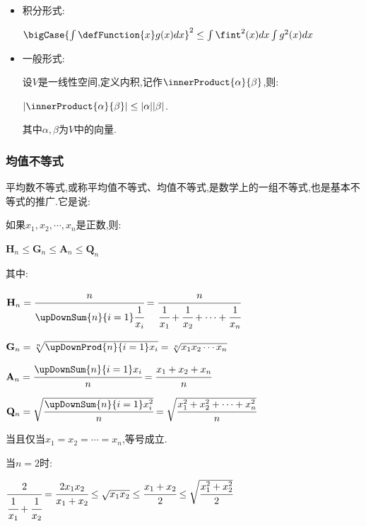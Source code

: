 {{{\begin{itemize}
{              在三角形$ABC$中,这个式子可以写作:$||\vec{AB}|| + ||\vec{BC}|| \geq ||\vec{AC}||$

              也就是说:$\sqrt{a^2 + b^2} + \sqrt{c^2 + d^2} \geq \sqrt{(a - c)^2 + (b - d)^2}$

              等号成立的条件为:$ad = bc,且ac + bc \geq 0$(即$\cfrac{a}{c} = \cfrac{b}{d}$).
              }
        \item {
              积分形式:

              $\bigCase{\int\defFunction{x}g(x)dx}^2 \leq \int\fint^2(x)dx \int g^2(x)dx$
              }
        \item {
              一般形式:

              设$V$是一线性空间,定义内积,记作$\innerProduct{\alpha}{\beta}$,则:

              $|\innerProduct{\alpha}{\beta}| \leq |\alpha||\beta|$.

              其中$\alpha,\beta$为$V$中的向量.
              }
    \end{itemize}
}%

\subsubsection{均值不等式}{
平均数不等式,或称平均值不等式、均值不等式,是数学上的一组不等式,也是基本不等式的推广.它是说:

如果$x_{1},x_{2},\dotsm,x_{n}$是正数,则:

$\mathbf{H}_n \leq \mathbf{G}_n \leq \mathbf{A}_n \leq \mathbf{Q}_n$

其中:

$\mathbf{H}_n = \cfrac{n}{\upDownSum{n}{i = 1}\cfrac{1}{x_i}} = \cfrac{n}{\cfrac{1}{x_1} + \cfrac{1}{x_2} + \dotsm + \cfrac{1}{x_n}}$

$\mathbf{G}_n = \sqrt[n]{\upDownProd{n}{i = 1}x_i} = \sqrt[n]{x_1x_2\dotsm x_n}$

$\mathbf{A}_n = \cfrac{\upDownSum{n}{i = 1}x_i}{n} = \cfrac{x_1 + x_2 + x_n}{n}$

$\mathbf{Q}_n = \sqrt{\cfrac{\upDownSum{n}{i = 1}x^2_i}{n}} = \sqrt{\cfrac{x^2_1 + x^2_2 + \dotsm + x^2_n}{n}}$

当且仅当$x_1 = x_2 = \dotsm = x_n$,等号成立.

当$n = 2$时:

$\cfrac{2}{\cfrac{1}{x_1} + \cfrac{1}{x_2}} = \cfrac{2x_1x_2}{x_1 + x_2}\leq\sqrt{x_1x_2}\leq\cfrac{x_1 + x_2}{2}\leq\sqrt{\cfrac{x_1^2 + x_2^2}{2}}$

}}}
